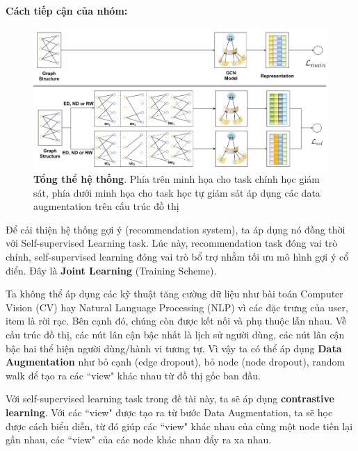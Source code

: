\documentclass{article}[14pt]
\begin{document}
    \textbf{Cách tiếp cận của nhóm:}
    \begin{figure}[h]
        \centering
        \captionsetup{width=0.9\linewidth}
        \includegraphics[width=0.9\linewidth]{images/tasks.png}
        \caption{\textbf{Tổng thể hệ thống}. Phía trên minh họa cho task chính học giám sát, phía dưới minh họa cho task học tự giám sát áp dụng các data augmentation trên cấu trúc đồ thị \cite{sgl}}
        \label{fig:tasks}
    \end{figure}
    
    Để cải thiện hệ thống gợi ý (recommendation system), ta áp dụng nó đồng thời với Self-supervised Learning task. Lúc này, recommendation task đóng vai trò chính, self-supervised learning đóng vai trò bổ trợ nhằm tối ưu mô hình gợi ý cổ điển. Đây là \textbf{Joint Learning} (Training Scheme).

    Ta không thể áp dụng các kỹ thuật tăng cường dữ liệu như bài toán Computer Vision (CV) hay Natural Language Processing (NLP) vì các đặc trưng của user, item là rời rạc. Bên cạnh đó, chúng còn được kết nối và phụ thuộc lẫn nhau. Về cấu trúc đồ thị, các nút lân cận bậc nhất là lịch sử người dùng, các nút lân cận bậc hai thể hiện người dùng/hành vi tương tự. Vì vậy ta có thể áp dụng \textbf{Data Augmentation} như bỏ cạnh (edge dropout), bỏ node (node dropout), random walk để tạo ra các “view" khác nhau từ đồ thị gốc ban đầu.

    Với self-supervised learning task trong đề tài này, ta sẽ áp dụng \textbf{contrastive learning}. Với các “view" được tạo ra từ bước Data Augmentation, ta sẽ học được cách biểu diễn, từ đó giúp các “view" khác nhau của cùng một node tiến lại gần nhau, các “view" của các node khác nhau đẩy ra xa nhau.    
    
\end{document}
